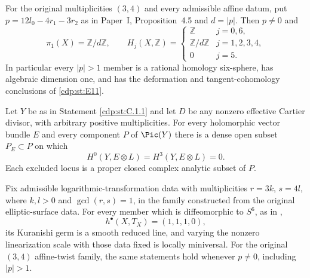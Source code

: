 
\begin{proposition}\label{cdp:st:E19}
For the original multiplicities $(3,4)$ and every admissible affine
datum, put $p=12l_0-4r_1-3r_2$ as in Paper~I, Proposition~4.5 and $d=|p|$.
Then $p\ne0$ and
\[
 \pi_1(X)=\mathbb Z/d\mathbb Z,
 \qquad
 H_j(X,\mathbb Z)=
 \begin{cases}
  \mathbb Z&j=0,6,\\
  \mathbb Z/d\mathbb Z&j=1,2,3,4,\\
  0&j=5.
 \end{cases}
\]
In particular every $|p|>1$ member is a rational homology
six-sphere, has algebraic dimension one, and has the deformation
and tangent-cohomology conclusions of \ref{cdp:st:E11}.
\end{proposition}

\begin{proposition}\label{cdp:st:C.1.2}
Let $Y$ be as in Statement \ref{cdp:st:C.1.1} and let $D$ be any nonzero effective
Cartier divisor, with arbitrary positive multiplicities. For every
holomorphic vector bundle $E$ and every component $P$ of $\Pic(Y)$ there
is a dense open subset $P_E\subset P$ on which
\[
 H^0(Y,E\otimes L)=H^3(Y,E\otimes L)=0.
\]
Each excluded locus is a proper closed complex analytic subset of $P$.
\end{proposition}

\begin{proposition}\label{cdp:st:E11}
Fix admissible logarithmic-transformation data with multiplicities
$r=3k$, $s=4l$, where $k,l>0$ and $\gcd(r,s)=1$, in the family
constructed from the original elliptic-surface data. For every member
which is diffeomorphic to $S^6$, as in
\cite[Theorem labelled \texttt{t:main}]{Viaclovsky2026Log},
\[
 h^\bullet(X,T_X)=(1,1,1,0),
\]
its Kuranishi germ is a smooth reduced line, and varying the nonzero
linearization scale with those data fixed is locally miniversal.
For the original $(3,4)$ affine-twist family, the same statements
hold whenever $p\ne0$, including $|p|>1$.
\end{proposition}

